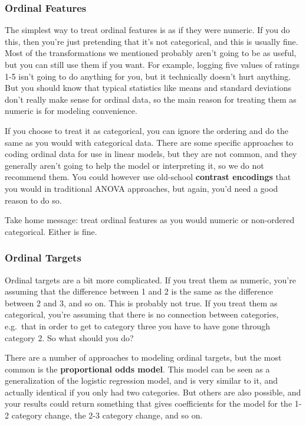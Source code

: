 \documentclass[
  letterpaper,
]{krantz}
\begin{document}
\subsubsection{Ordinal Features}\label{ordinal-features}

The simplest way to treat ordinal features is as if they were numeric.
If you do this, then you're just pretending that it's not categorical,
and this is usually fine. Most of the transformations we mentioned
probably aren't going to be as useful, but you can still use them if you
want. For example, logging five values of ratings 1-5 isn't going to do
anything for you, but it technically doesn't hurt anything. But you
should know that typical statistics like means and standard deviations
don't really make sense for ordinal data, so the main reason for
treating them as numeric is for modeling convenience.

If you choose to treat it as categorical, you can ignore the ordering
and do the same as you would with categorical data. There are some
specific approaches to coding ordinal data for use in linear models, but
they are not common, and they generally aren't going to help the model
or interpreting it, so we do not recommend them. You could however use
old-school \textbf{contrast encodings} that you would in traditional
ANOVA approaches, but again, you'd need a good reason to do so.

Take home message: treat ordinal features as you would numeric or
non-ordered categorical. Either is fine.

\subsubsection{Ordinal Targets}\label{ordinal-targets}

Ordinal targets are a bit more complicated. If you treat them as
numeric, you're assuming that the difference between 1 and 2 is the same
as the difference between 2 and 3, and so on. This is probably not true.
If you treat them as categorical, you're assuming that there is no
connection between categories, e.g.~that in order to get to category
three you have to have gone through category 2. So what should you do?

There are a number of approaches to modeling ordinal targets, but the
most common is the \textbf{proportional odds model}. This model can be
seen as a generalization of the logistic regression model, and is very
similar to it, and actually identical if you only had two categories.
But others are also possible, and your results could return something
that gives coefficients for the model for the 1-2 category change, the
2-3 category change, and so on.
\end{document}
